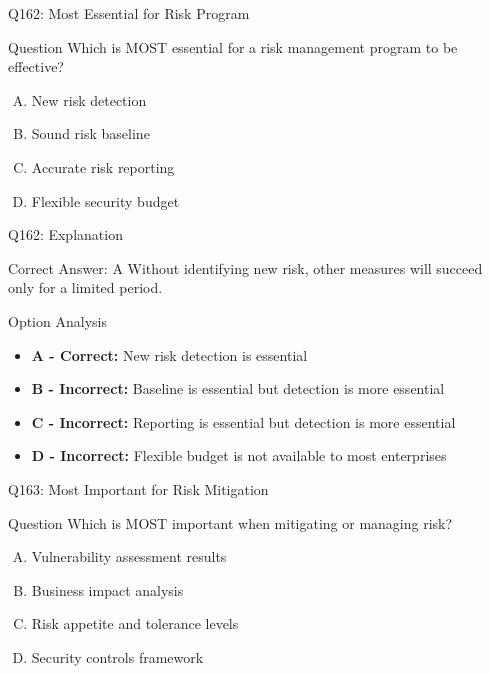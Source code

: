\documentclass{beamer}
\begin{document}
	\begin{frame}{Q162: Most Essential for Risk Program}
		\begin{block}{Question}
			Which is MOST essential for a risk management program to be effective?
		\end{block}
		\begin{enumerate}[(A)]
			\item New risk detection
			\item Sound risk baseline
			\item Accurate risk reporting
			\item Flexible security budget
		\end{enumerate}
	\end{frame}
	
	\begin{frame}{Q162: Explanation}
		\begin{block}{Correct Answer: A}
			Without identifying new risk, other measures will succeed only for a limited period.
		\end{block}
		\begin{block}{Option Analysis}
			\begin{itemize}
				\item \textbf{A - Correct:} New risk detection is essential
				\item \textbf{B - Incorrect:} Baseline is essential but detection is more essential
				\item \textbf{C - Incorrect:} Reporting is essential but detection is more essential
				\item \textbf{D - Incorrect:} Flexible budget is not available to most enterprises
			\end{itemize}
		\end{block}
	\end{frame}
	
	\begin{frame}{Q163: Most Important for Risk Mitigation}
		\begin{block}{Question}
			Which is MOST important when mitigating or managing risk?
		\end{block}
		\begin{enumerate}[(A)]
			\item Vulnerability assessment results
			\item Business impact analysis
			\item Risk appetite and tolerance levels
			\item Security controls framework
		\end{enumerate}
	\end{frame}
	
\end{document}

